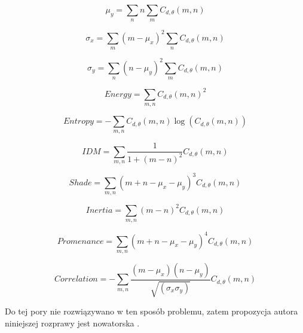 \begin{equation}
\mu_{y} = \displaystyle\sum\limits_{n} n \displaystyle\sum\limits_{m} C_{d,\theta}(m,n)
\end{equation}

\begin{equation}
\sigma_{x} = \displaystyle\sum\limits_{m}(m-\mu_x)^2 \displaystyle\sum\limits_{n} C_{d,\theta}(m,n)
\end{equation}

\begin{equation}
\sigma_{y} = \displaystyle\sum\limits_{n}(n-\mu_y)^2 \displaystyle\sum\limits_{m} C_{d,\theta}(m,n)
\end{equation}

\begin{equation}
Energy = \displaystyle\sum\limits_{m,n} C_{d,\theta}(m,n)^2
\end{equation}

\begin{equation}
Entropy = -\displaystyle\sum\limits_{m,n} C_{d,\theta}(m,n)\log(C_{d,\theta}(m,n))
\end{equation}

\begin{equation}
IDM = \displaystyle\sum\limits_{m,n}\frac{1}{1 + (m - n)^2} C_{d,\theta}(m,n)
\end{equation}

\begin{equation}
Shade = \displaystyle\sum\limits_{m,n}(m + n - \mu_x - \mu_y)^3 C_{d,\theta}(m,n)
\end{equation}

\begin{equation}
Inertia = \displaystyle\sum\limits_{m,n}(m-n)^2 C_{d,\theta}(m,n)
\end{equation}

\begin{equation}
Promenance = \displaystyle\sum\limits_{m,n}(m+n-\mu_x-\mu_y)^4 C_{d,\theta}(m,n)
\end{equation}

\begin{equation}
Correlation = -\displaystyle\sum\limits_{m,n}\frac{(m-\mu_x)(n-\mu_y)}{\sqrt{(\sigma_x \sigma_y)}} C_{d,\theta}(m,n)
\end{equation}

Do tej pory nie rozwiązywano w ten sposób problemu, zatem propozycja autora niniejszej rozprawy jest nowatorska \cite{SanFrancisco-poster}. 
